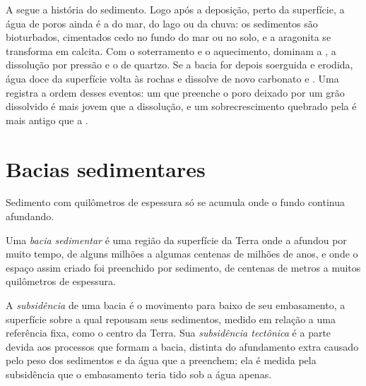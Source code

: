 A  segue a história do sedimento. Logo após a deposição, perto da superfície, a
água de poros ainda é a do mar, do lago ou da chuva: os sedimentos são bioturbados,
cimentados cedo no fundo do mar ou no solo, e a aragonita se transforma em calcita. Com o
soterramento e o aquecimento, dominam a , a dissolução por pressão e o 
de quartzo. Se a bacia for depois soerguida e erodida, água doce da superfície volta às
rochas e dissolve de novo carbonato e . Uma  registra a ordem desses
eventos: um  que preenche o poro deixado por um grão dissolvido é mais jovem que a
dissolução, e um sobrecrescimento quebrado pela  é mais antigo que a .

\section{Bacias sedimentares}\label{sec:b1:diagenesis-basins:basins}

Sedimento com quilômetros de espessura só se acumula onde o fundo continua afundando.

\begin{definition}\label{def:b1:diagenesis-basins:basin}
Uma \emph{bacia sedimentar} é uma região da superfície da Terra onde a
 afundou por muito tempo, de alguns milhões a algumas centenas de milhões de anos, e
onde o espaço assim criado foi preenchido por sedimento, de centenas de metros a muitos
quilômetros de espessura.
\end{definition}

\begin{definition}\label{def:b1:diagenesis-basins:subsidence}
A \emph{subsidência} de uma bacia é o movimento para baixo de seu
embasamento, a superfície sobre a qual repousam seus sedimentos, medido em relação a uma
referência fixa, como o centro da Terra. Sua \emph{subsidência tectônica} é a parte devida aos processos que formam a bacia, distinta do afundamento extra
causado pelo peso dos sedimentos e da água que a preenchem; ela é medida pela subsidência que
o embasamento teria tido sob a água apenas.
\end{definition}

